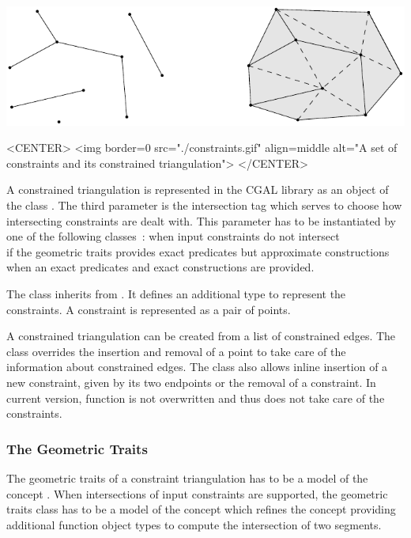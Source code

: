 \begin{ccTexOnly}
\begin{center} \includegraphics{Triangulation_2/constraints} \end{center}
\end{ccTexOnly}
 
\begin{ccHtmlOnly}
<CENTER>
<img border=0 src="./constraints.gif" align=middle alt="A set of
constraints and its constrained triangulation">
</CENTER>
\end{ccHtmlOnly}

A constrained triangulation is represented in the CGAL library as an
object of the class .
The third parameter  is the intersection tag
which serves to choose how intersecting constraints
are dealt with. This parameter has to be instantiated
by one of the following classes~:
 when input constraints do not
intersect \\
 if the geometric traits provides
exact predicates but approximate constructions \\
 when an exact predicates
and exact constructions are provided.

The class 
inherits from .
It defines an additional type 
to represent the constraints. A
constraint is represented as a pair of points.

A  constrained triangulation can be created
from a
list of constrained edges.
The class 
overrides the insertion and removal of a point to take care of the
information about constrained edges. The class also allows inline
insertion of a new constraint, given by its two endpoints
or the removal of a constraint.
In current version, function  is not 
overwritten and thus does not take care of the constraints.

\subsubsection{The Geometric Traits}
The geometric traits of a constraint triangulation
 has to be a model
of the concept .
When intersections of input constraints are supported, 
the geometric traits class has to be a model 
of the concept 
which refines the concept 
providing  additional function object types
to compute the intersection of two segments.

